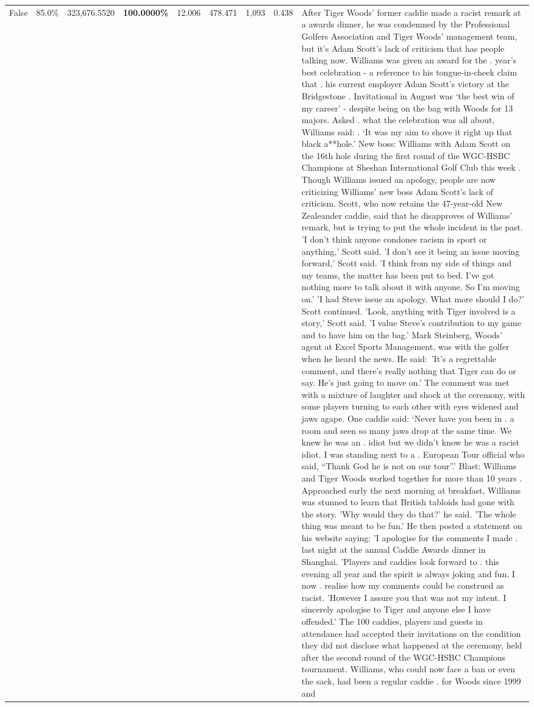 \begin{table}[H]
\begin{tabular}{lllrlllll}
False & 85.0\% & 323,676.5520 & \bfseries \color{red} 100.0000\% & 12.006 & 478.471 & 1,093 & 0.438 & After Tiger Woods' former caddie made a racist remark at a awards dinner, he was condemned by the Professional Golfers Association and Tiger Woods' management team, but it's Adam Scott's lack of criticism that has people talking now. Williams was given an award for the . year’s best celebration - a reference to his tongue-in-cheek claim that . his current employer Adam Scott’s victory at the Bridgestone . Invitational in August was ‘the best win of my career’ - despite being on the bag with Woods for 13 majors. Asked . what the celebration was all about, Williams said: . ‘It was my aim to shove it right up that black a**hole.’ New boss: Williams with Adam Scott  on the 16th hole during the first round of the WGC-HSBC Champions at Sheshan International Golf Club this week . Though Williams issued an apology, people are now criticizing Williams' new boss Adam Scott's lack of criticism. Scott, who now retains the 47-year-old New Zealeander caddie, said that he disapproves of Williams' remark, but is trying to put the whole incident in the past. 'I don't think anyone condones racism in sport or anything,' Scott said. 'I don't see it being an issue moving forward,' Scott said. 'I think from my side of things and my teams, the matter has been put to bed. I've got nothing more to talk about it with anyone. So I'm moving on.' 'I had Steve issue an apology. What more should I do?' Scott continued. 'Look, anything with Tiger involved is a story,' Scott said. 'I value Steve's contribution to my game and to have him on the bag.' Mark Steinberg, Woods' agent at Excel Sports Management, was with the golfer when he heard the news. He said: 'It's a regrettable comment, and there's really nothing that Tiger can do or say. He's just going to move on.' The comment was met with a mixture of laughter and shock at the ceremony, with some players turning to each other with eyes widened and jaws agape. One caddie said: ‘Never have you been in . a room and seen so many jaws drop at the same time. We knew he was an . idiot but we didn’t know he was a racist idiot. I was standing next to a . European Tour official who said, “Thank God he is not on our tour”.’ Blast: Williams and Tiger Woods worked together for more than 10 years . Approached early the next morning at breakfast, Williams was stunned to learn that British tabloids had gone with the story. 'Why would they do that?' he said. 'The whole thing was meant to be fun.' He then posted a statement on his website saying: 'I apologise for the comments I made . last night at the annual Caddie Awards dinner in Shanghai. 'Players and caddies look forward to . this evening all year and the spirit is always joking and fun. I now . realise how my comments could be construed as racist. 'However I assure you that was not my intent. I sincerely apologise to Tiger and anyone else I have offended.' The 100 caddies, players and guests in attendance had accepted their invitations on the condition they did not disclose what happened at the ceremony, held after the second round of the WGC-HSBC Champions tournament. Williams, who could now face a ban or even the sack, had been a regular caddie . for Woods since 1999 and 
\end{tabular}
\end{table}

